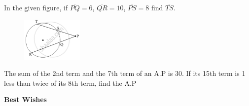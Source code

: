 \documentclass[11pt, a4paper]{exam}
\begin{document}
\begin{questions}
	\pointsdroppedatright
	\question
	In the given figure, if $\overline{PQ}=6$, $\overline{QR}=10$, $\overline{PS}=8$ find $\overline{TS}$.
	\begin{figure}[h!]
	\centering
	\includegraphics[width=0.27\textwidth]{figs/ques.png}
	\end{figure}



	\question
	The sum of the 2nd term and the 7th term of an A.P is 30. If its 15th term is 1 less than twice of its 8th term, find the A.P 

\end{questions}
\vspace{0.1in}
{\large \bfseries Best Wishes}
\end{document}
